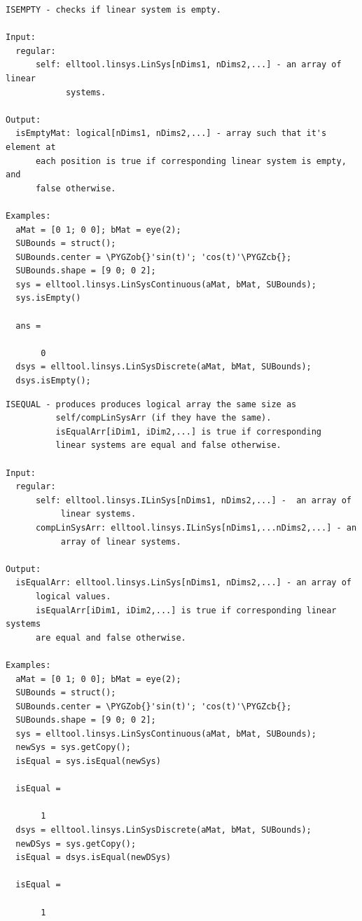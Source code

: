 \documentclass[letterpaper,10pt,english]{sphinxmanual}
\def\PYGZob{\char`\{}
\def\PYGZcb{\char`\}}
\begin{document}
\begin{Verbatim}[commandchars=\\\{\}]
ISEMPTY - checks if linear system is empty.

Input:
  regular:
      self: elltool.linsys.LinSys[nDims1, nDims2,...] - an array of linear
            systems.

Output:
  isEmptyMat: logical[nDims1, nDims2,...] - array such that it's element at
      each position is true if corresponding linear system is empty, and
      false otherwise.

Examples:
  aMat = [0 1; 0 0]; bMat = eye(2);
  SUBounds = struct();
  SUBounds.center = \PYGZob{}'sin(t)'; 'cos(t)'\PYGZcb{};
  SUBounds.shape = [9 0; 0 2];
  sys = elltool.linsys.LinSysContinuous(aMat, bMat, SUBounds);
  sys.isEmpty()

  ans =

       0
  dsys = elltool.linsys.LinSysDiscrete(aMat, bMat, SUBounds);
  dsys.isEmpty();
\end{Verbatim}

\begin{Verbatim}[commandchars=\\\{\}]
ISEQUAL - produces produces logical array the same size as
          self/compLinSysArr (if they have the same).
          isEqualArr[iDim1, iDim2,...] is true if corresponding
          linear systems are equal and false otherwise.

Input:
  regular:
      self: elltool.linsys.ILinSys[nDims1, nDims2,...] -  an array of
           linear systems.
      compLinSysArr: elltool.linsys.ILinSys[nDims1,...nDims2,...] - an
           array of linear systems.

Output:
  isEqualArr: elltool.linsys.LinSys[nDims1, nDims2,...] - an array of
      logical values.
      isEqualArr[iDim1, iDim2,...] is true if corresponding linear systems
      are equal and false otherwise.

Examples:
  aMat = [0 1; 0 0]; bMat = eye(2);
  SUBounds = struct();
  SUBounds.center = \PYGZob{}'sin(t)'; 'cos(t)'\PYGZcb{};
  SUBounds.shape = [9 0; 0 2];
  sys = elltool.linsys.LinSysContinuous(aMat, bMat, SUBounds);
  newSys = sys.getCopy();
  isEqual = sys.isEqual(newSys)

  isEqual =

       1
  dsys = elltool.linsys.LinSysDiscrete(aMat, bMat, SUBounds);
  newDSys = sys.getCopy();
  isEqual = dsys.isEqual(newDSys)

  isEqual =

       1
\end{Verbatim}
\end{document}
